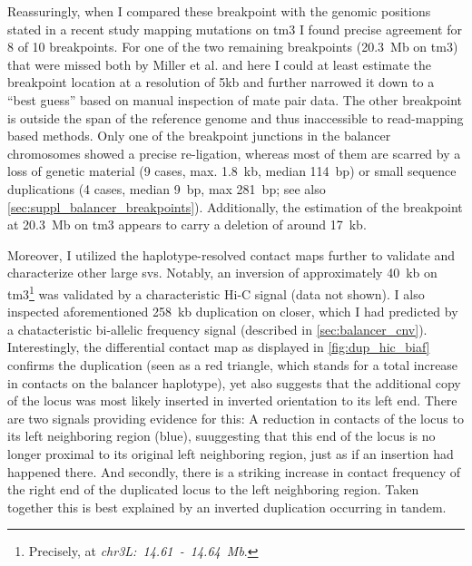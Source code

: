 Reassuringly, when I compared these
breakpoint with the genomic positions stated in a recent study mapping mutations
on \ac{tm3} \citep{Miller2016} I found precise agreement for 8 of 10
breakpoints. For one of the two remaining breakpoints (20.3~Mb on \ac{tm3})
that were missed both by Miller et al. and here I could at least estimate the
breakpoint location at a resolution of 5kb and further narrowed it down to a
``best guess'' based on manual inspection of mate pair data. The other
breakpoint is outside the span of the reference genome and thus inaccessible to
read-mapping based methods. Only one of the breakpoint junctions in the balancer
chromosomes showed a precise re-ligation, whereas most of them are scarred by a
loss of genetic material (9 cases, max. 1.8~kb, median 114~bp) or small sequence
duplications (4 cases, median 9~bp, max 281~bp; see also
\cref{sec:suppl_balancer_breakpoints}). Additionally, the estimation of the
breakpoint at 20.3~Mb on \ac{tm3} appears to carry a deletion of around 17~kb.

Moreover, I utilized the haplotype-resolved contact maps further to validate and
characterize other large \acp{sv}. Notably, an inversion of approximately 40~kb
on \ac{tm3}\footnote{Precisely, at \textit{chr3L:~14.61~-~14.64~Mb}.} was
validated by a characteristic Hi-C signal (data not shown). I also inspected
aforementioned 258~kb duplication on \cyo closer, which I had predicted by a
chatacteristic bi-allelic frequency signal (described in
\cref{sec:balancer_cnv}). Interestingly, the differential \hic contact map as
displayed in \cref{fig:dup_hic_biaf} confirms the duplication (seen as a red
triangle, which stands for a total increase in contacts on the balancer
haplotype), yet also suggests that the additional copy of the locus was most
likely inserted in inverted orientation to its left end. There are two signals
providing evidence for this: A reduction in contacts of the locus to its left
neighboring region (blue), suuggesting that this end of the locus is no longer
proximal to its original left neighboring region, just as if an insertion had
happened there. And secondly, there is a striking increase in contact frequency
of the right end of the duplicated locus to the left neighboring region. Taken
together this is best explained by an inverted duplication occurring in tandem.

